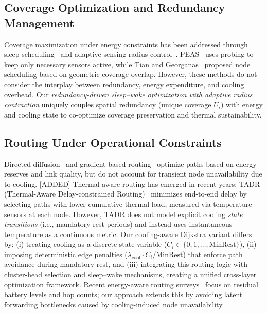 \subsection{Coverage Optimization and Redundancy Management}
Coverage maximization under energy constraints has been addressed through sleep scheduling~\cite{ye2003peas,tian2002node} and adaptive sensing radius control~\cite{wang2007coverage}. PEAS~\cite{ye2003peas} uses probing to keep only necessary sensors active, while Tian and Georganas~\cite{tian2002node} proposed node scheduling based on geometric coverage overlap. However, these methods do not consider the interplay between redundancy, energy expenditure, and cooling overhead. Our \emph{redundancy-driven sleep--wake optimization with adaptive radius contraction} uniquely couples spatial redundancy (unique coverage $U_i$) with energy and cooling state to co-optimize coverage preservation and thermal sustainability.

\subsection{Routing Under Operational Constraints}
Directed diffusion~\cite{intanagonwiwat2000directed} and gradient-based routing~\cite{schurgers2002energy} optimize paths based on energy reserves and link quality, but do not account for transient node unavailability due to cooling. [ADDED] Thermal-aware routing has emerged in recent years: TADR (Thermal-Aware Delay-constrained Routing)~\cite{chen2019tadr} minimizes end-to-end delay by selecting paths with lower cumulative thermal load, measured via temperature sensors at each node. However, TADR does not model explicit cooling \emph{state transitions} (i.e., mandatory rest periods) and instead uses instantaneous temperature as a continuous metric. Our cooling-aware Dijkstra variant differs by: (i) treating cooling as a discrete state variable ($C_i \in \{0,1,\ldots,\text{MinRest}\}$), (ii) imposing deterministic edge penalties ($\lambda_{\text{cool}} \cdot C_i/\text{MinRest}$) that enforce path avoidance during mandatory rest, and (iii) integrating this routing logic with cluster-head selection and sleep--wake mechanisms, creating a unified cross-layer optimization framework. Recent energy-aware routing surveys~\cite{mittal2017survey} focus on residual battery levels and hop counts; our approach extends this by avoiding latent forwarding bottlenecks caused by cooling-induced node unavailability.

